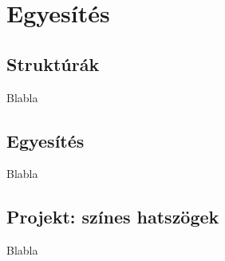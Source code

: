 \chapter{Egyesítés}
\section{Struktúrák}
Blabla
\section{Egyesítés}
Blabla
\section{Projekt: színes hatszögek}
Blabla
